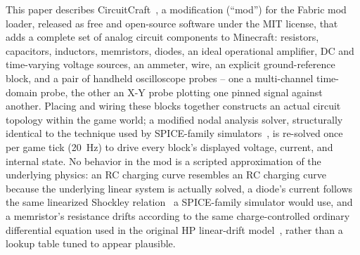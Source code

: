 This paper describes CircuitCraft~\cite{picos2026circuitcraft}, a modification
(``mod'') for the Fabric mod loader, released as free and open-source software under the MIT
license, that adds a complete set of analog circuit components to Minecraft: resistors,
capacitors, inductors, memristors, diodes, an ideal operational amplifier, DC and
time-varying voltage sources, an ammeter, wire, an explicit ground-reference block, and a
pair of handheld oscilloscope probes -- one a multi-channel time-domain probe, the other an
X-Y probe plotting one pinned signal against another. Placing and wiring these blocks
together constructs an actual circuit topology within the game world; a modified nodal
analysis solver, structurally identical to the technique used by SPICE-family
simulators~\cite{ho1975mna}, is re-solved once per game tick (20~Hz) to drive every block's
displayed voltage, current, and internal state. No behavior in the mod is a scripted
approximation of the underlying physics: an RC charging curve resembles an RC charging curve
because the underlying linear system is actually solved, a diode's current follows the same
linearized Shockley relation~\cite{shockley1949diode} a SPICE-family simulator would use, and
a memristor's resistance drifts according to the same charge-controlled ordinary differential
equation used in the original HP linear-drift model~\cite{strukov2008missing}, rather than a
lookup table tuned to appear plausible.

